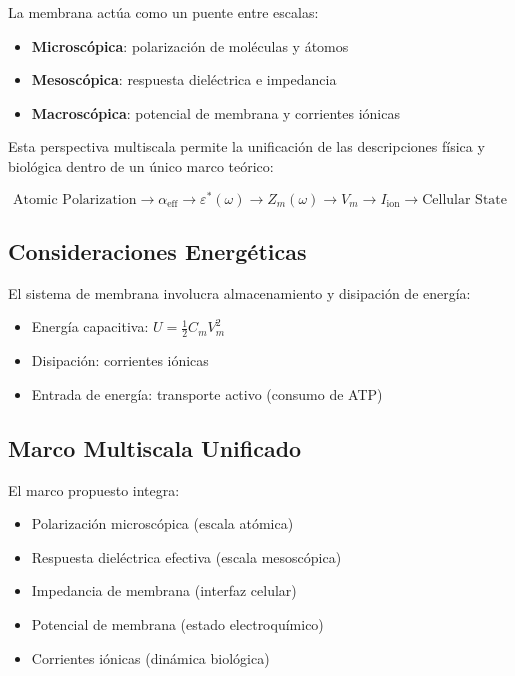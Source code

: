 \documentclass[12pt]{article}
\begin{document}
La membrana act\'ua como un puente entre escalas:

\begin{itemize}
\item \textbf{Microsc\'opica}: polarizaci\'on de mol\'eculas y \'atomos
\item \textbf{Mesosc\'opica}: respuesta diel\'ectrica e impedancia
\item \textbf{Macrosc\'opica}: potencial de membrana y corrientes i\'onicas
\end{itemize}

Esta perspectiva multiscala permite la unificaci\'on de las descripciones f\'isica y biol\'ogica
dentro de un \'unico marco te\'orico:

\begin{equation}
\text{Atomic Polarization}
\rightarrow
\alpha_{\text{eff}}
\rightarrow
\varepsilon^*(\omega)
\rightarrow
Z_m(\omega)
\rightarrow
V_m
\rightarrow
I_{\text{ion}}
\rightarrow
\text{Cellular State}
\end{equation}

\subsection{Consideraciones Energ\'eticas}

El sistema de membrana involucra almacenamiento y disipaci\'on de energ\'ia:

\begin{itemize}
\item Energ\'ia capacitiva: $U = \frac{1}{2} C_m V_m^2$
\item Disipaci\'on: corrientes i\'onicas
\item Entrada de energ\'ia: transporte activo (consumo de ATP)

\end{itemize}

\subsection{Marco Multiscala Unificado}

El marco propuesto integra:

\begin{itemize}
\item Polarizaci\'on microsc\'opica (escala at\'omica)
\item Respuesta diel\'ectrica efectiva (escala mesosc\'opica)
\item Impedancia de membrana (interfaz celular)
\item Potencial de membrana (estado electroqu\'imico)
\item Corrientes i\'onicas (din\'amica biol\'ogica)
\end{itemize}
\end{document}
